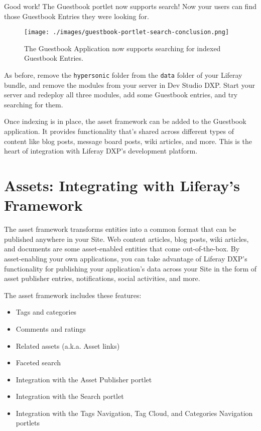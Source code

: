 Good work! The Guestbook portlet now supports search! Now your users can
find those Guestbook Entries they were looking for.

\begin{figure}
\centering
\texttt{[image: ./images/guestbook-portlet-search-conclusion.png]}
\caption{The Guestbook Application now supports searching for indexed
Guestbook Entries.}
\end{figure}

As before, remove the \texttt{hypersonic} folder from the \texttt{data}
folder of your Liferay bundle, and remove the modules from your server
in Dev Studio DXP. Start your server and redeploy all three modules, add
some Guestbook entries, and try searching for them.

Once indexing is in place, the asset framework can be added to the
Guestbook application. It provides functionality that's shared across
different types of content like blog posts, message board posts, wiki
articles, and more. This is the heart of integration with Liferay DXP's
development platform.

\chapter{Assets: Integrating with Liferay's
Framework}\label{assets-integrating-with-liferays-framework}

The asset framework transforms entities into a common format that can be
published anywhere in your Site. Web content articles, blog posts, wiki
articles, and documents are some asset-enabled entities that come
out-of-the-box. By asset-enabling your own applications, you can take
advantage of Liferay DXP's functionality for publishing your
application's data across your Site in the form of asset publisher
entries, notifications, social activities, and more.

The asset framework includes these features:

\begin{itemize}
\tightlist
\item
  Tags and categories
\item
  Comments and ratings
\item
  Related assets (a.k.a. Asset links)
\item
  Faceted search
\item
  Integration with the Asset Publisher portlet
\item
  Integration with the Search portlet
\item
  Integration with the Tags Navigation, Tag Cloud, and Categories
  Navigation portlets
\end{itemize}

